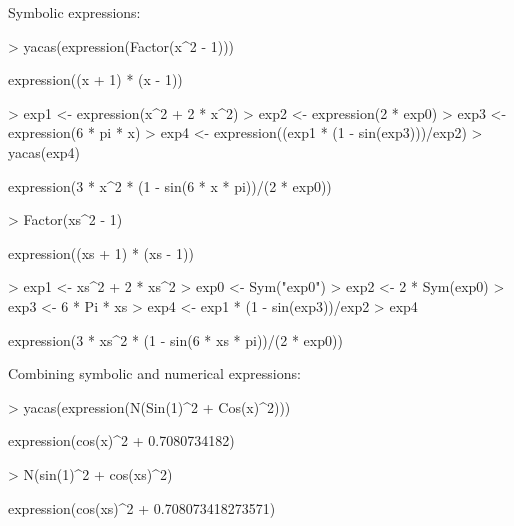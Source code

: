 \documentclass[]{article}
\begin{document}
Symbolic expressions:
\begin{Schunk}
\begin{Sinput}
> yacas(expression(Factor(x^2 - 1)))
\end{Sinput}
\begin{Soutput}
expression((x + 1) * (x - 1))
\end{Soutput}
\begin{Sinput}
> exp1 <- expression(x^2 + 2 * x^2)
> exp2 <- expression(2 * exp0)
> exp3 <- expression(6 * pi * x)
> exp4 <- expression((exp1 * (1 - sin(exp3)))/exp2)
> yacas(exp4)
\end{Sinput}
\begin{Soutput}
expression(3 * x^2 * (1 - sin(6 * x * pi))/(2 * exp0))
\end{Soutput}
\end{Schunk}

\begin{Schunk}
\begin{Sinput}
> Factor(xs^2 - 1)
\end{Sinput}
\begin{Soutput}
expression((xs + 1) * (xs - 1))
\end{Soutput}
\begin{Sinput}
> exp1 <- xs^2 + 2 * xs^2
> exp0 <- Sym("exp0")
> exp2 <- 2 * Sym(exp0)
> exp3 <- 6 * Pi * xs
> exp4 <- exp1 * (1 - sin(exp3))/exp2
> exp4
\end{Sinput}
\begin{Soutput}
expression(3 * xs^2 * (1 - sin(6 * xs * pi))/(2 * exp0))
\end{Soutput}
\end{Schunk}



Combining symbolic and numerical expressions:
\begin{Schunk}
\begin{Sinput}
> yacas(expression(N(Sin(1)^2 + Cos(x)^2)))
\end{Sinput}
\begin{Soutput}
expression(cos(x)^2 + 0.7080734182)
\end{Soutput}
\end{Schunk}

\begin{Schunk}
\begin{Sinput}
> N(sin(1)^2 + cos(xs)^2)
\end{Sinput}
\begin{Soutput}
expression(cos(xs)^2 + 0.708073418273571)
\end{Soutput}
\end{Schunk}
\end{document}
